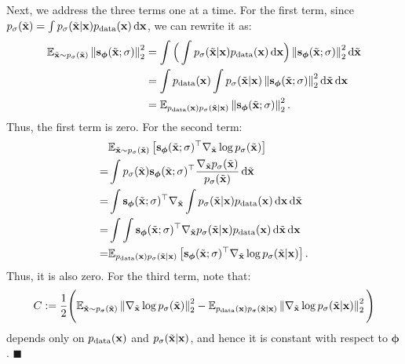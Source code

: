 Next, we address the three terms one at a time. For the first term, since $p_\sigma(\tilde{{\mathbf{x}}}) = \int p_{\sigma}(\tilde{{\mathbf{x}}} | {\mathbf{x}}) p_{\text{data}}({\mathbf{x}}) \mathop{}\!\mathrm{d}{\mathbf{x}}$, we can rewrite it as:
\begin{align*}
    \mathbb{E}_{\tilde{{\mathbf{x}}} \sim p_\sigma(\tilde{{\mathbf{x}}})} \left\lVert{\mathbf{s}}_{\bm{\phi}}(\tilde{{\mathbf{x}}}; \sigma)\right\rVert_2^2 
    &= \int \Big( \int p_{\sigma}(\tilde{{\mathbf{x}}} | {\mathbf{x}}) p_{\text{data}}({\mathbf{x}})  \mathop{}\!\mathrm{d}{\mathbf{x}} \Big) \left\lVert{\mathbf{s}}_{\bm{\phi}}(\tilde{{\mathbf{x}}}; \sigma)\right\rVert_2^2 \mathop{}\!\mathrm{d} \tilde{{\mathbf{x}}} 
    \\ &= \int p_{\text{data}}({\mathbf{x}}) \int p_{\sigma}(\tilde{{\mathbf{x}}} | {\mathbf{x}}) \left\lVert{\mathbf{s}}_{\bm{\phi}}(\tilde{{\mathbf{x}}}; \sigma)\right\rVert_2^2 \mathop{}\!\mathrm{d} \tilde{{\mathbf{x}}} \mathop{}\!\mathrm{d}{\mathbf{x}}
    \\ &= \mathbb{E}_{ p_{\text{data}}({\mathbf{x}})p_{\sigma}(\tilde{{\mathbf{x}}} | {\mathbf{x}})} \left\lVert{\mathbf{s}}_{\bm{\phi}}(\tilde{{\mathbf{x}}}; \sigma)\right\rVert_2^2.
\end{align*}
Thus, the first term is zero. For the second term:
\begin{align}\label{eq:dsm-sec-term}
\begin{aligned}
          &\mathbb{E}_{\tilde{{\mathbf{x}}} \sim p_\sigma(\tilde{{\mathbf{x}}})}\left[ {\mathbf{s}}_{\bm{\phi}}(\tilde{{\mathbf{x}}}; \sigma)^\top  \nabla_{\tilde{{\mathbf{x}}}} \log p_\sigma(\tilde{{\mathbf{x}}}) \right] 
      \\=&\int  p_\sigma(\tilde{{\mathbf{x}}}) {\mathbf{s}}_{\bm{\phi}}(\tilde{{\mathbf{x}}}; \sigma)^\top  \frac{\nabla_{\tilde{{\mathbf{x}}}} p_\sigma(\tilde{{\mathbf{x}}})}{p_\sigma(\tilde{{\mathbf{x}}})}  \mathop{}\!\mathrm{d}\tilde{{\mathbf{x}}}
        \\=&\int   {\mathbf{s}}_{\bm{\phi}}(\tilde{{\mathbf{x}}}; \sigma)^\top  \nabla_{\tilde{{\mathbf{x}}}} \int p_{\sigma}(\tilde{{\mathbf{x}}} | {\mathbf{x}}) p_{\text{data}}({\mathbf{x}}) \mathop{}\!\mathrm{d}{\mathbf{x}} \mathop{}\!\mathrm{d}\tilde{{\mathbf{x}}}
    \\=&\int \int  {\mathbf{s}}_{\bm{\phi}}(\tilde{{\mathbf{x}}}; \sigma)^\top    \nabla_{\tilde{{\mathbf{x}}}}p_{\sigma}(\tilde{{\mathbf{x}}} | {\mathbf{x}}) p_{\text{data}}({\mathbf{x}}) \mathop{}\!\mathrm{d}\tilde{{\mathbf{x}}} \mathop{}\!\mathrm{d}{\mathbf{x}} 
      \\=  &\mathbb{E}_{ p_{\text{data}}({\mathbf{x}})p_{\sigma}(\tilde{{\mathbf{x}}} | {\mathbf{x}})}\left[ {\mathbf{s}}_{\bm{\phi}}(\tilde{{\mathbf{x}}}; \sigma)^\top  \nabla_{\tilde{{\mathbf{x}}}} \log p_\sigma(\tilde{{\mathbf{x}}}| {\mathbf{x}})\right].
\end{aligned}
\end{align}
Thus, it is also zero. For the third term, note that:
\[
C:=\frac{1}{2}\Bigg(\mathbb{E}_{\tilde{{\mathbf{x}}} \sim p_\sigma(\tilde{{\mathbf{x}}})}  \left\lVert\nabla_{\tilde{{\mathbf{x}}}} \log p_\sigma(\tilde{{\mathbf{x}}})\right\rVert_2^2  -  \mathbb{E}_{ p_{\text{data}}({\mathbf{x}})p_{\sigma}(\tilde{{\mathbf{x}}} | {\mathbf{x}})} \left\lVert\nabla_{\tilde{{\mathbf{x}}}} \log p_{\sigma}(\tilde{{\mathbf{x}}} | {\mathbf{x}})\right\rVert_2^2   \Bigg)
\]
depends only on $p_{\text{data}}({\mathbf{x}})$ and $p_{\sigma}(\tilde{{\mathbf{x}}}|{\mathbf{x}})$, and hence it is constant with respect to $\bm{\phi}$.
\hfill$\blacksquare$

